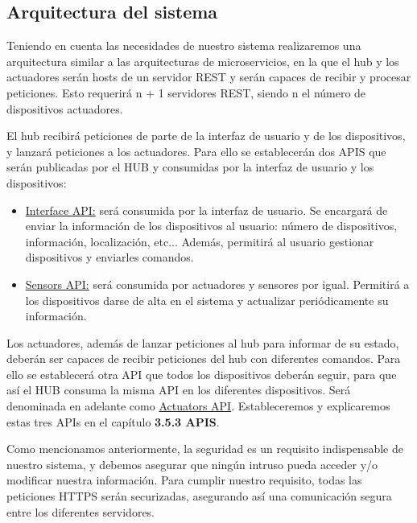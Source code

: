 \subsection{Arquitectura del sistema}
Teniendo en cuenta las necesidades de nuestro sistema realizaremos una arquitectura similar a las arquitecturas de microservicios,
en la que el hub y los actuadores serán hosts de un servidor REST y serán capaces de recibir y procesar peticiones.
Esto requerirá n + 1 servidores REST, siendo n el número de dispositivos actuadores.
\par
El hub recibirá peticiones de parte de la interfaz de usuario y de los dispositivos, y lanzará peticiones a los actuadores.
Para ello se establecerán dos APIS que serán publicadas por el HUB y consumidas por la interfaz de usuario y los dispositivos:
\begin{itemize}
\setlength\itemsep{6pt plus 1pt minus 1pt}
\item \underline{Interface API:} será consumida por la interfaz de usuario. Se encargará de enviar la información de los dispositivos al usuario: número
 de dispositivos, información, localización, etc... Además, permitirá al usuario gestionar dispositivos y enviarles comandos.
\item \underline{Sensors API:} será consumida por actuadores y sensores por igual. Permitirá a los dispositivos darse de alta en el sistema y actualizar
periódicamente su información.
\end{itemize}
\par
Los actuadores, además de lanzar peticiones al hub para informar de su estado, deberán ser capaces de recibir peticiones del hub con
diferentes comandos. Para ello se establecerá otra API que todos los dispositivos deberán seguir, para que así el HUB consuma la misma API
en los diferentes dispositivos. Será denominada en adelante como \underline{Actuators API}. Estableceremos y explicaremos estas tres APIs en el capítulo
\textbf{3.5.3 APIS}.
\par
Como mencionamos anteriormente, la seguridad es un requisito indispensable de nuestro sistema, y debemos asegurar que ningún intruso pueda acceder y/o modificar nuestra información.
Para cumplir nuestro requisito, todas las peticiones HTTPS serán securizadas, asegurando así una comunicación segura entre los diferentes servidores.

